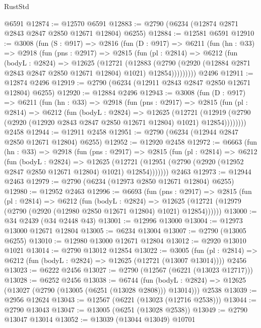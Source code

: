 \begin{lexlean}{RustStd}
\begin{coremodule}
{\begin{coremodule}
{{{{{{{{{{{{{{{{{{{{{{{{{{    @6591
@12874 := @12570 @6591
@12883 := @2790 (@6234 (@12874 @2871 @2843 @2847 @2850 @12671 @12804) @6255)
@12884 := @12581 @6591
@12910 := @3008
    (fun (S : @917) =>
    @2816
      (fun (D : @917) =>
      @6211
        (fun (hn : @33) =>
        @2918
          (fun (pns : @2917) =>
          @2815
            (fun (pl : @2814) =>
            @6212
              (fun (bodyL : @2824) =>
              @12625
                (@12721
                  (@12883
                    (@2790
                      (@2920 (@12884 @2871 @2843 @2847 @2850 @12671 @12804) @1021)
                      @12854)))))))))
    @2496
@12911 := @12874 @2496
@12919 := @2790 (@6234 (@12911 @2843 @2847 @2850 @12671 @12804) @6255)
@12920 := @12884 @2496
@12943 := @3008
    (fun (D : @917) =>
    @6211
      (fun (hn : @33) =>
      @2918
        (fun (pns : @2917) =>
        @2815
          (fun (pl : @2814) =>
          @6212
            (fun (bodyL : @2824) =>
            @12625
              (@12721
                (@12919 (@2790 (@2920 (@12920 @2843 @2847 @2850 @12671 @12804) @1021) @12854))))))))
    @2458
@12944 := @12911 @2458
@12951 := @2790 (@6234 (@12944 @2847 @2850 @12671 @12804) @6255)
@12952 := @12920 @2458
@12972 := @6663
    (fun (hn : @33) =>
    @2918
      (fun (pns : @2917) =>
      @2815
        (fun (pl : @2814) =>
        @6212
          (fun (bodyL : @2824) =>
          @12625
            (@12721 (@12951 (@2790 (@2920 (@12952 @2847 @2850 @12671 @12804) @1021) @12854)))))))
    @2463
@12973 := @12944 @2463
@12979 := @2790 (@6234 (@12973 @2850 @12671 @12804) @6255)
@12980 := @12952 @2463
@12996 := @6693
    (fun (pns : @2917) =>
    @2815
      (fun (pl : @2814) =>
      @6212
        (fun (bodyL : @2824) =>
        @12625 (@12721 (@12979 (@2790 (@2920 (@12980 @2850 @12671 @12804) @1021) @12854))))))
@13000 := @34 @2439 (@34 @2448 @43)
@13001 := @12996 @13000
@13004 := @12973 @13000 @12671 @12804
@13005 := @6234 @13004
@13007 := @2790 (@13005 @6255)
@13010 := @12980 @13000 @12671 @12804
@13012 := @2920 @13010 @1021
@13014 := @2790 @13012 @12854
@13022 := @3005
    (fun (pl : @2814) => @6212 (fun (bodyL : @2824) => @12625 (@12721 (@13007 @13014))))
    @2456
@13023 := @6222 @2456
@13027 := @2790 (@12567 (@6221 (@13023 @12717)))
@13028 := @6252 @2456
@13038 := @6744
    (fun (bodyL : @2824) => @12625 (@13027 (@2790 (@13005 (@6251 (@13028 @2808))) @13014)))
    @2538
@13039 := @2956 @12624
@13043 := @12567 (@6221 (@13023 (@12716 @2538)))
@13044 := @2790 @13043
@13047 := @13005 (@6251 (@13028 @2538))
@13049 := @2790 @13047 @13014
@13052 := @13039 (@13044 @13049) @10701
}}}}}}}}}}}}}}}}}}}}}}}}}}
\end{coremodule}}
\end{coremodule}
\end{lexlean}
